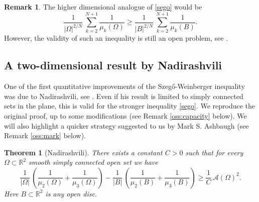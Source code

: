 \documentclass{amsart}
\newtheorem{theorem}[lemma]{Theorem}
\theoremstyle{definition}
\newtheorem{remark}[lemma]{Remark}
\numberwithin{equation}{section}
\begin{document}
\begin{remark}
The higher dimensional analogue of \eqref{sego} would be
\[
\frac{1}{|\Omega|^{2/N}}\,\sum_{k=2}^{N+1} \frac{1}{\mu_k(\Omega)}\ge \frac{1}{|B|^{2/N}}\,\sum_{k=2}^{N+1} \frac{1}{\mu_k(B)}.
\]
However, the validity of such an inequality is still an open problem, see \cite[page 106]{MR2251558}.
\end{remark}

\subsection{A two-dimensional result by Nadirashvili}

One of the first quantitative improvements of the Szeg\H{o}-Weinberger inequality was due to Nadirashvili, see \cite{MR1476715}. Even if his result is limited to simply connected sets in the plane, this is valid for the stronger inequality \eqref{sego}. We reproduce the original proof, up to some modifications (see Remark \ref{oss:capacity} below). We will also highlight a quicker strategy suggested to us by Mark S. Ashbaugh (see Remark \ref{oss:mark} below).
\begin{theorem}[Nadirashvili]
\label{thm:nikolaisego}
There exists a constant $C>0$ such that for every $\Omega\subset\mathbb{R}^2$ smooth simply connected open set we have
\begin{equation}
\label{nikolaisego}
\frac{1}{|\Omega|}\,\left(\frac{1}{\mu_2(\Omega)}+\frac{1}{\mu_3(\Omega)}\right)-\frac{1}{|B|}\,\left(\frac{1}{\mu_2(B)}+\frac{1}{\mu_3(B)}\right)\ge \frac{1}{C}\, \mathcal{A}(\Omega)^2.
\end{equation}
Here $B\subset\mathbb{R}^2$ is any open disc.
\end{theorem}
\end{document}
